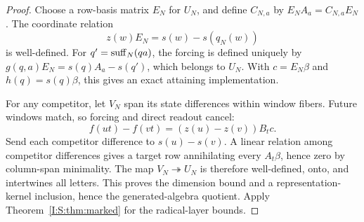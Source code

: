 \begin{proof}
Choose a row-basis matrix $E_N$ for $U_N$, and define $C_{N,a}$ by $E_NA_a=C_{N,a}E_N$. The coordinate relation
\[
 z(w)E_N=s(w)-s(q_N(w))
\]
is well-defined. For $q'=\operatorname{suff}_N(qa)$, the forcing is defined uniquely by
$g(q,a)E_N=s(q)A_a-s(q')$, which belongs to $U_N$. With $c=E_N\beta$ and $h(q)=s(q)\beta$, this gives an exact attaining implementation.

For any competitor, let $V_N$ span its state differences within window fibers. Future windows match, so forcing and direct readout cancel:
\[
 f(ut)-f(vt)=(z(u)-z(v))B_tc.
\]
Send each competitor difference to $s(u)-s(v)$. A linear relation among competitor differences gives a target row annihilating every $A_t\beta$, hence zero by column-span minimality. The map $V_N\twoheadrightarrow U_N$ is therefore well-defined, onto, and intertwines all letters. This proves the dimension bound and a representation-kernel inclusion, hence the generated-algebra quotient. Apply Theorem~\ref{I:S:thm:marked} for the radical-layer bounds.
\end{proof}
